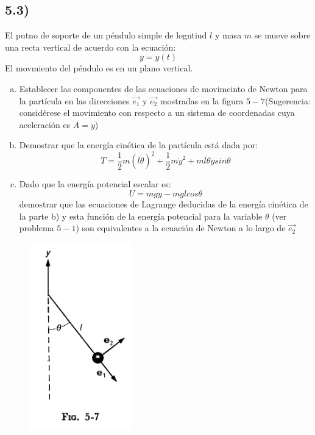 \documentclass{article}
\begin{document}
\subsection*{5.3)}
El putno de soporte de un péndulo simple de logntiud $l$ y masa $m$ se mueve sobre 
una recta vertical de acuerdo con la ecuación:
\[y= y(t)\]
El movmiento del péndulo es en un plano vertical.
\begin{enumerate}[a)]
    \item Establecer las componentes de las ecuaciones de movimeinto de Newton 
    para la partícula en las direcciones $\vec{e_1}$ y $\vec{e_2}$ mostradas en
    la figura $5-7$(Sugerencia: considérese el movimiento con respecto a un sistema
    de coordenadas cuya aceleración es $A=\ddot{y}$)
    \item Demostrar que la energía cinética de la partícula está dada por:
    \[ T = \frac{1}{2}m(l\dot{\theta})^2 + \frac{1}{2}m\dot{y}^2 + ml\dot{\theta}\dot{y}sin\theta \]
    \item Dado que la energía potencial escalar es:
    \[ U = mgy - mglcos\theta \]
    demostrar que las ecuaciones de Lagrange deducidas de la energía cinética de la 
    parte b) y esta función de la energía potencial para la variable $\theta$
    (ver problema $5-1$) son equivalentes a la ecuación de Newton a lo largo de $\vec{e_2}$
\end{enumerate}
\begin{figure}[H]
    \centering 
    \includegraphics[scale=0.8]{p1_pendulum.png}
\end{figure}
\end{document}
